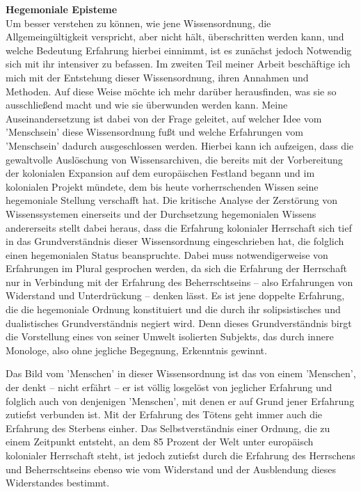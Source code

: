\textbf{\large Hegemoniale Episteme}\\

Um besser verstehen zu können, wie jene Wissensordnung, die Allgemeingültigkeit
verspricht, aber nicht hält, überschritten werden kann, und welche Bedeutung
Erfahrung hierbei einnimmt, ist es zunächst jedoch Notwendig sich mit ihr
intensiver zu befassen. Im zweiten Teil meiner Arbeit beschäftige ich mich mit
der Entstehung dieser Wissensordnung, ihren Annahmen und Methoden. Auf diese
Weise möchte ich mehr darüber herausfinden, was sie so ausschließend macht und
wie sie überwunden werden kann. Meine Auseinandersetzung ist dabei von der Frage
geleitet, auf welcher Idee vom 'Menschsein' diese Wissensordnung fußt und welche
Erfahrungen vom 'Menschsein' dadurch ausgeschlossen werden. Hierbei kann ich
aufzeigen, dass die gewaltvolle Auslöschung von Wissensarchiven, die bereits mit
der Vorbereitung der kolonialen Expansion auf dem europäischen Festland begann
und im kolonialen Projekt mündete, dem bis heute vorherrschenden Wissen seine
hegemoniale Stellung verschafft hat. Die kritische Analyse der Zerstörung von
Wissenssystemen einerseits und der Durchsetzung hegemonialen Wissens
andererseits stellt dabei heraus, dass die Erfahrung kolonialer Herrschaft sich
tief in das Grundverständnis dieser Wissensordnung eingeschrieben hat, die
folglich einen hegemonialen Status beanspruchte. Dabei muss notwendigerweise von
Erfahrungen im Plural gesprochen werden, da sich die Erfahrung der Herrschaft
nur in Verbindung mit der Erfahrung des Beherrschtseins – also Erfahrungen von
Widerstand und Unterdrückung – denken lässt. Es ist jene doppelte Erfahrung, die
die hegemoniale Ordnung konstituiert und die durch ihr solipsistisches und
dualistisches Grundverständnis negiert wird. Denn dieses Grundverständnis birgt
die Vorstellung eines von seiner Umwelt isolierten Subjekts, das durch innere
Monologe, also ohne jegliche Begegnung, Erkenntnis gewinnt.

Das Bild vom
'Menschen' in dieser Wissensordnung ist das von einem 'Menschen', der denkt –
nicht erfährt – er ist völlig losgelöst von jeglicher Erfahrung und folglich
auch von denjenigen 'Menschen', mit denen er auf Grund jener Erfahrung zutiefst
verbunden ist. Mit der Erfahrung des Tötens geht immer auch die Erfahrung des
Sterbens einher. Das Selbstverständnis einer Ordnung, die zu einem Zeitpunkt
entsteht, an dem 85 Prozent der Welt unter europäisch kolonialer Herrschaft
steht, ist jedoch zutiefst durch die Erfahrung des Herrschens und
Beherrschtseins ebenso wie vom Widerstand und der Ausblendung dieses
Widerstandes bestimmt.

